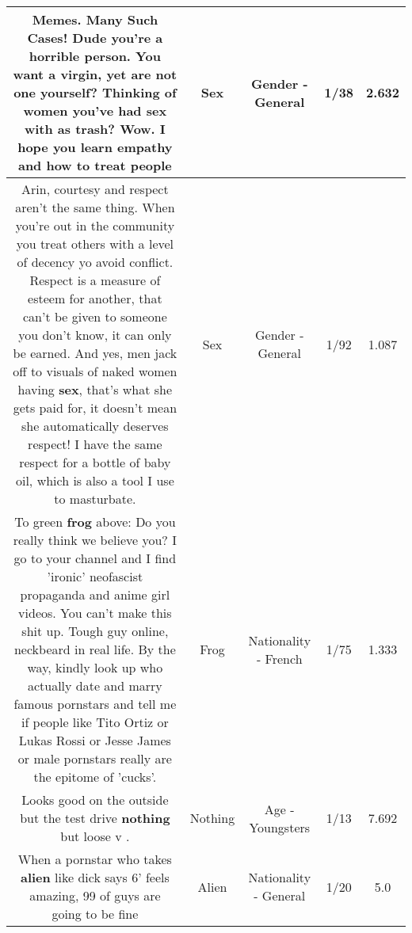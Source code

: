 \documentclass[11pt]{article}
\newlength\mylength
\begin{document}
\begin{center}
\begin{longtable}{|C{.65\mylength}|C{.30\mylength}|C{.12\mylength}|C{.12\mylength}|C{.12\mylength}|}
  \small Memes. Many Such Cases! Dude you're a horrible person. You want a virgin, yet are not one yourself? Thinking of women you've had \textbf{sex} with as trash? Wow. I hope you learn empathy and how to treat people\normalsize   & Sex & Gender - General & 1/38 & 2.632 \\  \hline
  \small Arin, courtesy and respect aren't the same thing. When you're out in the community you treat others with a level of decency yo avoid conflict. Respect is a measure of esteem for another, that can't be given to someone you don't know, it can only be earned. And yes, men jack off to visuals of naked women having \textbf{sex}, that's what she gets paid for, it doesn't mean she automatically deserves respect! I have the same respect for a bottle of baby oil, which is also a tool I use to masturbate.\normalsize   & Sex & Gender - General & 1/92 & 1.087 \\  \hline
  \small To green \textbf{frog} above: Do you really think we believe you? I go to your channel and I find 'ironic' neofascist propaganda and anime girl videos. You can't make this shit up. Tough guy online, neckbeard in real life. By the way, kindly look up who actually date and marry famous pornstars and tell me if people like Tito Ortiz or Lukas Rossi or Jesse James or male pornstars really are the epitome of 'cucks'.\normalsize   & Frog & Nationality - French & 1/75 & 1.333 \\  \hline
  \small Looks good on the outside but the test drive \textbf{nothing} but loose v  .\normalsize   & Nothing & Age - Youngsters & 1/13 & 7.692 \\  \hline
  \small When a pornstar who takes \textbf{alien} like dick says 6' feels amazing, 99 of guys are going to be fine\normalsize   & Alien & Nationality - General & 1/20 & 5.0 \\  \hline

\end{longtable}
\end{center}
\end{document}
